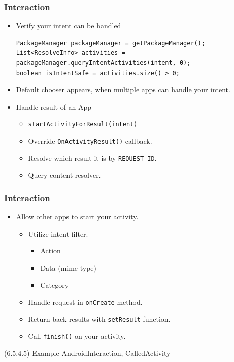 \documentclass[10pt,xcolor=pdflatex]{beamer}
\begin{document}
\begin{frame}[fragile]\frametitle{Interaction}
\begin{itemize}
	\item Verify your intent can be handled
	  \lstset{language=Java, basicstyle=\footnotesize\ttfamily}
            \begin{lstlisting}
PackageManager packageManager = getPackageManager();
List<ResolveInfo> activities = 
packageManager.queryIntentActivities(intent, 0);
boolean isIntentSafe = activities.size() > 0;
            \end{lstlisting}
    \item Default chooser appears, when multiple apps can handle your intent.
	\item Handle result of an App
      \begin{itemize}
    	\item \texttt{startActivityForResult(intent)}
		\item Override \texttt{OnActivityResult()} callback.
		\item Resolve which result it is by \texttt{REQUEST\_ID}.
		\item Query content resolver.
      \end{itemize}
\end{itemize}
\end{frame}


\begin{frame}[fragile]\frametitle{Interaction}
\begin{itemize}
	\item Allow other apps to start your activity.
	  \begin{itemize}
		\item Utilize intent filter.
          \begin{itemize}
            \item Action
            \item Data (mime type)
	        \item Category
          \end{itemize}
	  \end{itemize}
      \begin{itemize}
    	\item Handle request in \texttt{onCreate} method.
		\item Return back results with \texttt{setResult} function.
		\item Call \texttt{finish()} on your activity.
      \end{itemize}
\end{itemize}
\begin{textblock}{15}(6.5,4.5)
    {\footnotesize Example AndroidInteraction, CalledActivity}
\end{textblock}
\end{frame}
\end{document}
